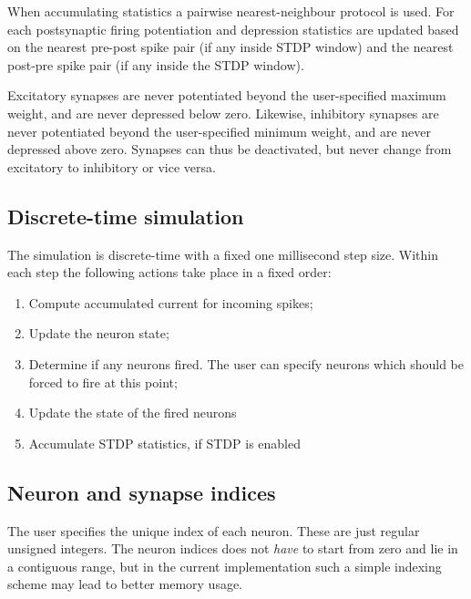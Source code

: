 \documentclass[a4paper]{article}
\begin{document}
When accumulating statistics a pairwise nearest-neighbour protocol is used.
For each postsynaptic firing potentiation and depression statistics are updated based
on the nearest pre-post spike pair (if any inside STDP window) 
and the nearest post-pre spike pair (if any inside the STDP window).

Excitatory synapses are never potentiated beyond the user-specified maximum weight,
and are never depressed below zero.
Likewise, inhibitory synapses are never potentiated beyond the  user-specified minimum weight,
and are never depressed above zero.
Synapses can thus be deactivated, but never change from excitatory to inhibitory or vice versa.




\subsection{Discrete-time simulation}
\label{model:step}

The simulation is discrete-time with a fixed one millisecond step size.
Within each step the following actions take place in a fixed order:

\begin{enumerate}
	\item Compute accumulated current for incoming spikes;
	\item Update the neuron state;
	\item Determine if any neurons fired. The user can specify neurons which should be forced to fire at this point;
	\item Update the state of the fired neurons
	\item Accumulate STDP statistics, if STDP is enabled
\end{enumerate}

\subsection{Neuron and synapse indices}

The user specifies the unique index of each neuron.
These are just regular unsigned integers.
The neuron indices does not \emph{have} to start from zero and lie in a contiguous range, 
	but in the current implementation such a simple indexing scheme may lead to better memory usage.
\end{document}
